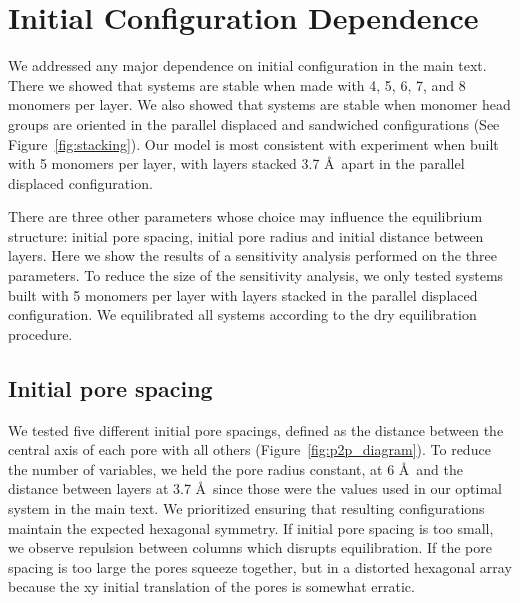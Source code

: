 \documentclass[journal=jpcbfk,manusciprt=article]{achemso}
\begin{document}

  \section{Initial Configuration Dependence}\label{section:initial_config_dependence}

  \vspace{1em}
  We addressed any major dependence on initial configuration in the main text.
  There we showed that systems are stable when made with 4, 5, 6, 7, and 8
  monomers per layer. We also showed that systems are stable when monomer head
  groups are oriented in the parallel displaced and sandwiched configurations
  (See Figure~\ref{fig:stacking}). Our model is most consistent with experiment
  when built with 5 monomers per layer, with layers stacked 3.7 \AA~apart in 
  the parallel displaced configuration. 

  There are three other parameters whose choice may influence the equilibrium
  structure: initial pore spacing, initial pore radius and initial distance
  between layers. Here we show the results of a sensitivity analysis performed
  on the three parameters. To reduce the size of the sensitivity analysis, we
  only tested systems built with 5 monomers per layer with layers stacked in 
  the parallel displaced configuration. We equilibrated all systems according
  to the dry equilibration procedure.


  \subsection{Initial pore spacing}\label{section:initial_pore_spacing}

	  We tested five different initial pore spacings, defined as the
	  distance between the central axis of each pore with all others
	  (Figure~\ref{fig:p2p_diagram}). To reduce the number of variables, we held the
	  pore radius constant, at 6 \AA~and the distance between layers at 3.7 \AA~since
	  those were the values used in our optimal system in the main text. We
	  prioritized ensuring that resulting configurations maintain the expected
	  hexagonal symmetry. If initial pore spacing is too small, we observe repulsion
	  between columns which disrupts equilibration. If the pore spacing is too large
	  the pores squeeze together, but in a distorted hexagonal array because the xy
	  initial translation of the pores is somewhat erratic. 
\end{document}
